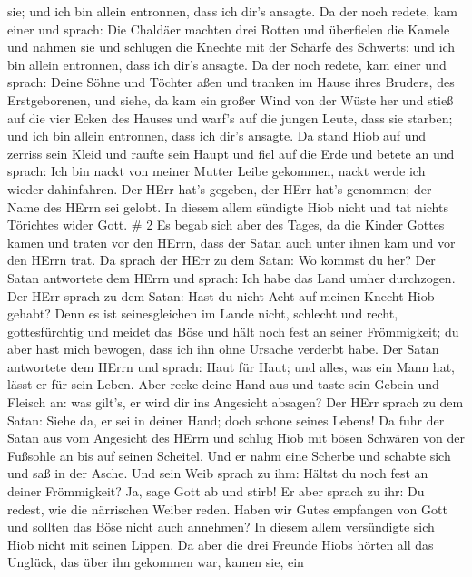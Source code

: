 sie; und ich bin allein entronnen, dass ich dir's ansagte. 
Da der noch redete, kam einer und sprach: Die Chaldäer machten drei
Rotten und überfielen die Kamele und nahmen sie und schlugen die Knechte
mit der Schärfe des Schwerts; und ich bin allein entronnen, dass ich
dir's ansagte.  Da der noch redete, kam einer und sprach:
Deine Söhne und Töchter aßen und tranken im Hause ihres Bruders, des
Erstgeborenen,  und siehe, da kam ein großer Wind von der
Wüste her und stieß auf die vier Ecken des Hauses und warf's auf die
jungen Leute, dass sie starben; und ich bin allein entronnen, dass ich
dir's ansagte.  Da stand Hiob auf und zerriss sein Kleid
und raufte sein Haupt und fiel auf die Erde und betete an 
und sprach: Ich bin nackt von meiner Mutter Leibe gekommen, nackt werde
ich wieder dahinfahren. Der HErr hat's gegeben, der HErr hat's genommen;
der Name des HErrn sei gelobt.  In diesem allem sündigte
Hiob nicht und tat nichts Törichtes wider Gott. \# 2  Es
begab sich aber des Tages, da die Kinder Gottes kamen und traten vor den
HErrn, dass der Satan auch unter ihnen kam und vor den HErrn trat.
 Da sprach der HErr zu dem Satan: Wo kommst du her? Der
Satan antwortete dem HErrn und sprach: Ich habe das Land umher
durchzogen.  Der HErr sprach zu dem Satan: Hast du nicht
Acht auf meinen Knecht Hiob gehabt? Denn es ist seinesgleichen im Lande
nicht, schlecht und recht, gottesfürchtig und meidet das Böse und hält
noch fest an seiner Frömmigkeit; du aber hast mich bewogen, dass ich ihn
ohne Ursache verderbt habe.  Der Satan antwortete dem HErrn
und sprach: Haut für Haut; und alles, was ein Mann hat, lässt er für
sein Leben.  Aber recke deine Hand aus und taste sein Gebein
und Fleisch an: was gilt's, er wird dir ins Angesicht absagen?
 Der HErr sprach zu dem Satan: Siehe da, er sei in deiner
Hand; doch schone seines Lebens!  Da fuhr der Satan aus vom
Angesicht des HErrn und schlug Hiob mit bösen Schwären von der Fußsohle
an bis auf seinen Scheitel.  Und er nahm eine Scherbe und
schabte sich und saß in der Asche.  Und sein Weib sprach zu
ihm: Hältst du noch fest an deiner Frömmigkeit? Ja, sage Gott ab und
stirb!  Er aber sprach zu ihr: Du redest, wie die
närrischen Weiber reden. Haben wir Gutes empfangen von Gott und sollten
das Böse nicht auch annehmen? In diesem allem versündigte sich Hiob
nicht mit seinen Lippen.  Da aber die drei Freunde Hiobs
hörten all das Unglück, das über ihn gekommen war, kamen sie, ein

